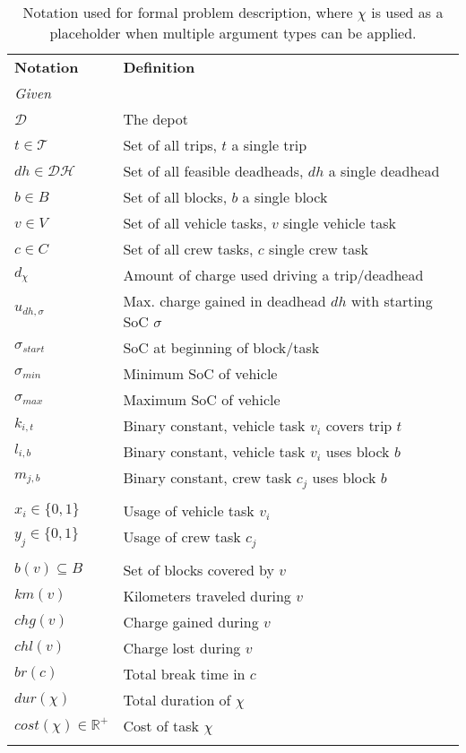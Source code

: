 \documentclass[]{article}
\begin{document}
\begin{table}[h]
  \centering
  \begin{tabular}{ll}
    \toprule
    \multicolumn{1}{l}{\textbf{Notation}} & \multicolumn{1}{l}{\textbf{Definition}}               \\
    \cmidrule(lr){1-1}\cmidrule(lr){2-2}
    \multicolumn{2}{l}{\textit{Given}} \\
    $\mathcal{D}$ & The depot \\ 
    $t \in \mathcal{T}$ & Set of all trips, $t$ a single trip \\
    $dh \in \mathcal{DH}$ & Set of all feasible deadheads, $dh$ a single deadhead \\ 
    $b \in B$ & Set of all blocks, $b$ a single block \\
    $v \in V$ & Set of all vehicle tasks, $v$ single vehicle task \\
    $c \in C$ & Set of all crew tasks, $c$ single crew task \\
    $d_\chi$ & Amount of charge used driving a trip/deadhead \\
    $u_{dh,\sigma}$ & Max. charge gained in deadhead $dh$ with starting SoC $\sigma$ \\
    $\sigma_{start}$ & SoC at beginning of block/task \\
    $\sigma_{min}$ & Minimum SoC of vehicle \\
    $\sigma_{max}$ & Maximum SoC of vehicle \\ 
    $k_{i,t}$ & Binary constant, vehicle task $v_i$ covers trip $t$ \\ 
    $l_{i,b}$ & Binary constant, vehicle task $v_i$ uses block $b$ \\ 
    $m_{j,b}$ & Binary constant, crew task $c_j$ uses block $b$ \\ 
    \addlinespace[0.6em]
    \multicolumn{2}{l}{\textit{Decision variables}} \\
    $x_{i} \in \{ 0, 1 \}$ & Usage of vehicle task $v_i$  \\ 
    $y_{j} \in \{ 0, 1 \}$ & Usage of crew task $c_j$ \\ 
    \addlinespace[0.6em]
    \multicolumn{2}{l}{\textit{Helper functions}} \\
    $b(v) \subseteq B$ & Set of blocks covered by $v$ \\ 
    $km(v)$ & Kilometers traveled during $v$ \\ 
    $chg(v)$ & Charge gained during $v$ \\ 
    $chl(v)$ & Charge lost during $v$ \\ 
    $br(c)$ & Total break time in $c$ \\ 
    $dur(\chi)$ & Total duration of $\chi$ \\ 
    $cost(\chi) \in \mathbb{R}^+$ & Cost of task $\chi$ \\ 
    \addlinespace[0.2em]
    \bottomrule
  \end{tabular}
  \caption{Notation used for formal problem description, where $\chi$ is used as a placeholder when multiple argument types can be applied.}
  \label{tab:notation}
\end{table}
\end{document}

